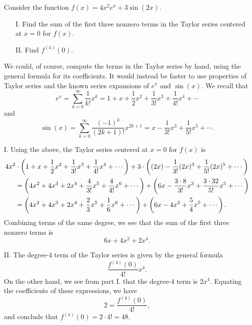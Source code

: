 \documentclass[]{ximera}
\begin{document}
\begin{problem} 
Consider the function $f(x) = 4x^2e^x+3\sin(2x)$.

\begin{itemize}
\item[I.] Find the sum of the first three nonzero terms in the Taylor series centered at $x=0$ for $f(x)$.
\item[II.] Find $f^{(4)}(0)$.
\end{itemize}

\begin{solution}
We could, of course, compute the terms in the Taylor series by hand, using the general formula for its coefficients. It would instead be faster to use properties of Taylor series and the known series expansions of $e^x$ and $\sin(x)$. We recall that 
$$
e^x = \sum_{k=0}^\infty \frac{1}{k!}x^k = 1 + x + \frac{1}{2} x^2 + \frac{1}{3!} x^3 + \frac{1}{4!}x^4 + \cdots
$$
and
$$
\sin(x) = \sum_{k=0}^\infty \frac{(-1)^k}{(2k+1)!} x^{2k+1} = x - \frac{1}{3!}x^3 + \frac{1}{5!}x^5 + \cdots.
$$

I. Using the above, the Taylor series centered at $x=0$ for $f(x)$ is
\begin{align*}
&4x^2 \cdot \left(1 + x + \frac{1}{2} x^2 + \frac{1}{3!} x^3 + \frac{1}{4!}x^4 + \cdots\right) + 3 \cdot \left((2x) - \frac{1}{3!}(2x)^3 + \frac{1}{5!}(2x)^5 + \cdots\right) \\
&\hspace{.2in} = \left(4x^2 + 4x^3 + 2x^4 + \frac{4}{3!} x^5 + \frac{4}{4!}x^6 + \cdots\right) + \left(6x - \frac{3 \cdot 8}{3!} x^3 + \frac{3 \cdot 32}{5!} x^5 + \cdots \right) \\
&\hspace{.2in} = \left(4x^2 + 4x^3 + 2x^4 + \frac{2}{3} x^5 + \frac{1}{6}x^6 + \cdots\right) + \left(6x - 4 x^3 + \frac{5}{4} x^5 + \cdots \right).
\end{align*}
Combining terms of the same degree, we see that the sum of the first three nonzero terms is
$$
6x + 4x^2 + 2x^4.
$$

II. The degree-$4$ term of the Taylor series is given by the general formula 
$$
\frac{f^{(4)}(0)}{4!} x^4.
$$
On the other hand, we see from part I. that the degree-$4$ term is $2x^4$. Equating the coefficients of these expressions, we have
$$
2 = \frac{f^{(4)}(0)}{4!},
$$
and conclude that $f^{(4)}(0) = 2 \cdot 4! = 48$.
\end{solution}
\end{problem}
\end{document}

